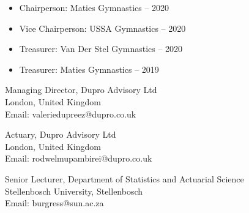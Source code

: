 \begin{itemize}
    \setlength{\itemindent}{0.5em}
    \item \small{Chairperson: Maties Gymnastics -- 2020}
    \item \small{Vice Chairperson: USSA Gymnastics -- 2020}
    \item \small{Treasurer: Van Der Stel Gymnastics -- 2020}
    \item \small{Treasurer: Maties Gymnastics -- 2019}
\end{itemize}





\small{Managing Director, Dupro Advisory Ltd}\\
\small{London, United Kingdom}\\
\small{Email: valeriedupreez@dupro.co.uk}\\

\medskip

\small{Actuary, Dupro Advisory Ltd}\\
\small{London, United Kingdom}\\
\small{Email: rodwelmupambirei@dupro.co.uk}\\

\medskip%

\small{Senior Lecturer, Department of Statistics and Actuarial Science}\\
\small{Stellenbosch University, Stellenbosch}\\
\small{Email: burgress@sun.ac.za}\\
\medskip
